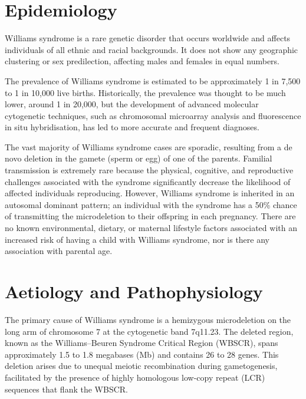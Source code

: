 \section*{Epidemiology}
Williams syndrome is a rare genetic disorder that occurs worldwide and affects individuals of all ethnic and racial backgrounds. It does not show any geographic clustering or sex predilection, affecting males and females in equal numbers.

The prevalence of Williams syndrome is estimated to be approximately 1 in 7,500 to 1 in 10,000 live births. Historically, the prevalence was thought to be much lower, around 1 in 20,000, but the development of advanced molecular cytogenetic techniques, such as chromosomal microarray analysis and fluorescence in situ hybridisation, has led to more accurate and frequent diagnoses.

The vast majority of Williams syndrome cases are sporadic, resulting from a de novo deletion in the gamete (sperm or egg) of one of the parents. Familial transmission is extremely rare because the physical, cognitive, and reproductive challenges associated with the syndrome significantly decrease the likelihood of affected individuals reproducing. However, Williams syndrome is inherited in an autosomal dominant pattern; an individual with the syndrome has a 50\% chance of transmitting the microdeletion to their offspring in each pregnancy. There are no known environmental, dietary, or maternal lifestyle factors associated with an increased risk of having a child with Williams syndrome, nor is there any association with parental age.

\section*{Aetiology and Pathophysiology}
The primary cause of Williams syndrome is a hemizygous microdeletion on the long arm of chromosome 7 at the cytogenetic band 7q11.23. The deleted region, known as the Williams--Beuren Syndrome Critical Region (WBSCR), spans approximately 1.5 to 1.8 megabases (Mb) and contains 26 to 28 genes. This deletion arises due to unequal meiotic recombination during gametogenesis, facilitated by the presence of highly homologous low-copy repeat (LCR) sequences that flank the WBSCR.

